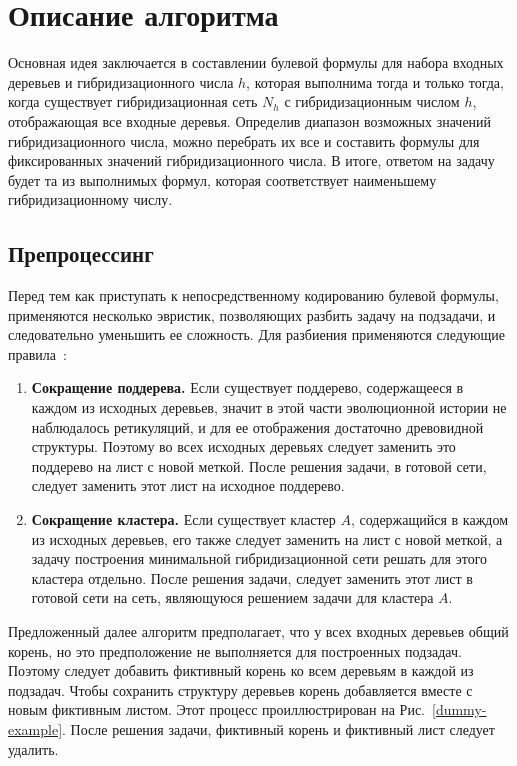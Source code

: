 \FloatBarrier
\chapter{Описание алгоритма}

Основная идея заключается в составлении булевой формулы для набора входных деревьев и гибридизационного числа $h$, которая выполнима тогда и только тогда, когда существует гибридизационная сеть $N_h$ с гибридизационным числом $h$, отображающая все входные деревья.
Определив диапазон возможных значений гибридизационного числа, можно перебрать их все и составить формулы для фиксированных значений гибридизационного числа.
В итоге, ответом на задачу будет та из выполнимых формул, которая соответствует наименьшему гибридизационному числу.

\FloatBarrier
\section{Препроцессинг}

Перед тем как приступать к непосредственному кодированию булевой формулы, применяются несколько эвристик, позволяющих разбить задачу на подзадачи, и следовательно уменьшить ее сложность.
Для разбиения применяются следующие правила~\cite{bonet2009efficiently}:

\begin{enumerate}
	\item \textbf{Сокращение поддерева.} Если существует поддерево, содержащееся в каждом из исходных деревьев, значит в этой части эволюционной истории не наблюдалось ретикуляций, и для ее отображения достаточно древовидной структуры.
	Поэтому во всех исходных деревьях следует заменить это поддерево на лист с новой меткой.
	После решения задачи, в готовой сети, следует заменить этот лист на исходное поддерево.
	\item \textbf{Сокращение кластера.} Если существует кластер $A$, содержащийся в каждом из исходных деревьев, его также следует заменить на лист с новой меткой, а задачу построения минимальной гибридизационной сети решать для этого кластера отдельно.
	После решения задачи, следует заменить этот лист в готовой сети на сеть, являющуюся решением задачи для кластера $A$.
\end{enumerate}

Предложенный далее алгоритм предполагает, что у всех входных деревьев общий корень, но это предположение не выполняется для построенных подзадач.
Поэтому следует добавить фиктивный корень ко всем деревьям в каждой из подзадач.
Чтобы сохранить структуру деревьев корень добавляется вместе с новым фиктивным листом.
Этот процесс проиллюстрирован на Рис.~\ref{dummy-example}.
После решения задачи, фиктивный корень и фиктивный лист следует удалить.

